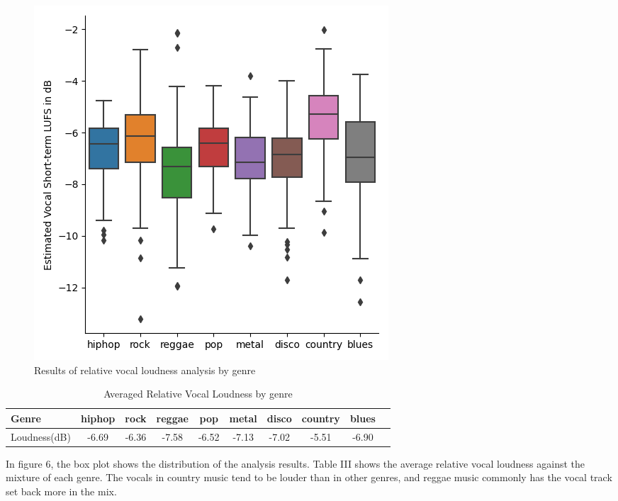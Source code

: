 \documentclass[conference]{IEEEtran}
\begin{document}
\FloatBarrier
\begin{figure}[h]
\includegraphics[scale=0.55]{catplot.png}
\centering
\caption{Results of relative vocal loudness analysis by genre}
\end{figure}
\FloatBarrier

\FloatBarrier
\bgrou
\def\arraystretch{1.3}
\setlength{\tabcolsep}{3pt}
\begin{table}[h]
\centering
 \caption{Averaged Relative Vocal Loudness by genre}
  \vspace*{-5mm}
 \begin{center}
\begin{tabular}{l*{8}{c}r}
\hline
\hline
Genre & hiphop & rock & reggae  &  pop & metal  & disco  & country & blues  \\
\hline
Loudness(dB) &  -6.69 &  -6.36 &
 -7.58 &-6.52 &  -7.13 &  -7.02 & -5.51 & -6.90  \\

 \hline
\end{tabular}
\egroup
\end{center}
\end{table}
\FloatBarrier

In figure 6, the box plot shows the distribution of the analysis results. Table III shows the average relative vocal loudness against the mixture of each genre. The vocals in country music tend to be louder than in other genres, and reggae music commonly has the vocal track set back more in the mix. 
\end{document}
